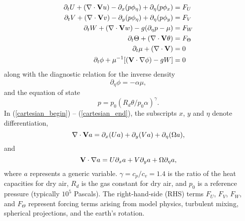 \begin{align}
 \partial_t U + (\nabla \cdot {\bf V} u )
- \partial_x      (p\phi_\eta)
+ \partial_\eta (p\phi_x) &= F_U 
\label{cartesian_begin}
\\
%
 \partial_t V + (\nabla \cdot {\bf V} v )
- \partial_y      (p\phi_\eta)
+ \partial_\eta (p\phi_y) &= F_V \\
%
 \partial_t W + (\nabla \cdot {\bf V} w )
- g (\partial_\eta p - \mu) &= F_W 
\label{cartesian_w} \\
%
\partial_t \Theta + (\nabla \cdot {\bf V} \theta )  & = F_\Theta 
\label{cartesian_theta} \\
%
\partial_t \mu + (\nabla \cdot {\bf V} ) & = 0 
\label{continuity0} \\
%
\partial_t \phi + \mu^{-1} [({\bf V} \cdot \nabla \phi ) -gW ] & = 0
\label{prognostic_end}
%
\end{align}
\noindent
along with the diagnostic relation for the inverse density
\begin{equation}
\partial_\eta \phi = - \alpha \mu,
\label{hydrostatic_relation}
\end{equation}
%
\noindent
and the equation of state
%
\begin{equation}
 p = p_0 (R_d \theta / p_0 \alpha)^{\gamma}.
\label{cartesian_end}
\end{equation}
%
\noindent
In (\ref{cartesian_begin}) -- (\ref{cartesian_end}), the subscripts 
$x$, $y$ and $\eta$ denote
differentiation, 
%
\begin{equation}
\nabla \cdot {\bf V } a = \partial_x (Ua) + 
                           \partial_y (Va) + 
                           \partial_\eta (\Omega a),
\notag
\end{equation}
%
\noindent
and
%
\begin{equation}
{\bf V} \cdot \nabla a = U \partial_x a + 
                           V \partial_y a + 
                           \Omega \partial_\eta a,
\notag
\end{equation}
%
\noindent
where $a$ represents a generic variable.  
$\gamma=c_p/c_v = 1.4$ is the ratio of
the heat capacities for dry air, $R_d$ is the gas constant for dry
air, and $p_0$ is a reference pressure (typically $10^5$ Pascals).
The right-hand-side (RHS) terms $F_U$, $F_V$, $F_W$, and
$F_\Theta$ represent forcing terms arising from model physics,
turbulent mixing, spherical projections, and the earth's rotation.

